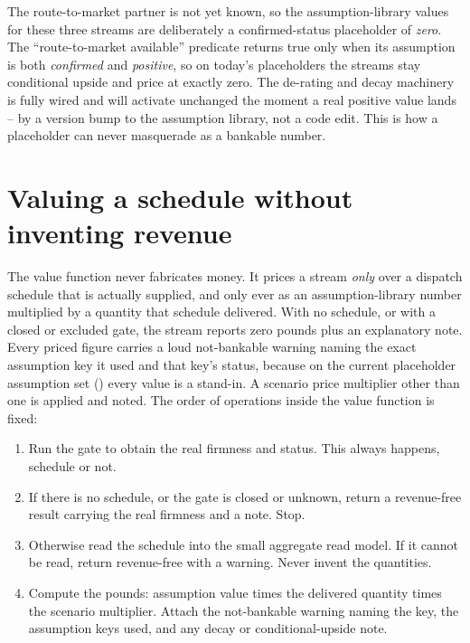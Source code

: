 \begin{caution}
The route-to-market partner is not yet known, so the assumption-library values for these three streams are deliberately a confirmed-status placeholder of \emph{zero}. The ``route-to-market available'' predicate returns true only when its assumption is both \emph{confirmed} and \emph{positive}, so on today's placeholders the streams stay conditional upside and price at exactly zero. The de-rating and decay machinery is fully wired and will activate unchanged the moment a real positive value lands -- by a version bump to the assumption library, not a code edit. This is how a placeholder can never masquerade as a bankable number.
\end{caution}

\section{Valuing a schedule without inventing revenue}

The value function never fabricates money. It prices a stream \emph{only} over a dispatch schedule that is actually supplied, and only ever as an assumption-library number multiplied by a quantity that schedule delivered. With no schedule, or with a closed or excluded gate, the stream reports zero pounds plus an explanatory note. Every priced figure carries a loud not-bankable warning naming the exact assumption key it used and that key's status, because on the current placeholder assumption set () every value is a stand-in. A scenario price multiplier other than one is applied and noted. The order of operations inside the value function is fixed:

\begin{enumerate}
  \item Run the gate to obtain the real firmness and status. This always happens, schedule or not.
  \item If there is no schedule, or the gate is closed or unknown, return a revenue-free result carrying the real firmness and a note. Stop.
  \item Otherwise read the schedule into the small aggregate read model. If it cannot be read, return revenue-free with a warning. Never invent the quantities.
  \item Compute the pounds: assumption value times the delivered quantity times the scenario multiplier. Attach the not-bankable warning naming the key, the assumption keys used, and any decay or conditional-upside note.
\end{enumerate}

